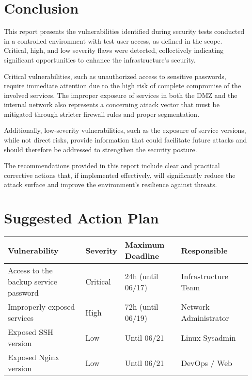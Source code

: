\documentclass[a4paper,12pt]{article}
\begin{document}
\section{Conclusion}

This report presents the vulnerabilities identified during security tests conducted in a controlled environment with test user access, as defined in the scope. Critical, high, and low severity flaws were detected, collectively indicating significant opportunities to enhance the infrastructure's security.

Critical vulnerabilities, such as unauthorized access to sensitive passwords, require immediate attention due to the high risk of complete compromise of the involved services. The improper exposure of services in both the DMZ and the internal network also represents a concerning attack vector that must be mitigated through stricter firewall rules and proper segmentation.

Additionally, low-severity vulnerabilities, such as the exposure of service versions, while not direct risks, provide information that could facilitate future attacks and should therefore be addressed to strengthen the security posture.

The recommendations provided in this report include clear and practical corrective actions that, if implemented effectively, will significantly reduce the attack surface and improve the environment's resilience against threats.

\clearpage

\section{Suggested Action Plan}

\begin{table}[H]
\centering
{}
\begin{tabular}{p{5cm}p{1.9cm}p{2.9cm}p{4cm}p{4.1cm}}
\toprule
\textbf{Vulnerability} & \textbf{Severity} & \textbf{Maximum Deadline} & \textbf{Responsible} \\
\midrule
Access to the backup service password & Critical & 24h (until 06/17) & Infrastructure Team \\
Improperly exposed services & High & 72h (until 06/19) & Network Administrator \\
Exposed SSH version & Low & Until 06/21 & Linux Sysadmin \\
Exposed Nginx version & Low & Until 06/21 & DevOps / Web \\
\bottomrule
\end{tabular}
\end{table}
\end{document}
